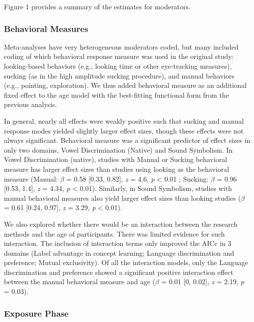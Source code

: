 \documentclass[10pt, letterpaper]{article}
\begin{document}
Figure 1 provides a summary of the estimates for moderators.

\hypertarget{behavioral-measures}{%
\subsubsection{Behavioral Measures}\label{behavioral-measures}}

Meta-analyses have very heterogeneous moderators coded, but many
included coding of which behavioral response measure was used in the
original study: looking-based behaviors (e.g., looking time or other
eye-tracking measures), sucking (as in the high amplitude sucking
procedure), and manual behaviors (e.g., pointing, exploration). We thus
added behavioral measure as an additional fixed effect to the age model
with the best-fitting functional form from the previous analysis.

In general, nearly all effects were weakly positive such that sucking
and manual response modes yielded slightly larger effect sizes, though
these effects were not always significant. Behavioral measure was a
significant predictor of effect sizes in only two domains, Vowel
Discrimination (Native) and Sound Symbolism. In Vowel Discrimination
(native), studies with Manual or Sucking behavioral measure has larger
effect sizes than studies using looking as the behavioral measure
(Manual: \(\beta\) = 0.58 {[}0.33, 0.82{]}, \emph{z} = 4.6, \emph{p}
\textless{} 0.01 ; Sucking: \(\beta\) = 0.96 {[}0.53, 1.4{]}, \emph{z} =
4.34, \emph{p} \textless{} 0.01). Similarly, in Sound Symbolism, studies
with manual behavioral measures also yield larger effect sizes than
looking studies (\(\beta\) = 0.61 {[}0.24, 0.97{]}, \emph{z} = 3.29,
\emph{p} \textless{} 0.01).

We also explored whether there would be an interaction between the
research methods and the age of participants. There was limited evidence
for such interaction. The inclusion of interaction terms only improved
the AICc in 3 domains (Label advantage in concept learning; Language
discrimination and preference; Mutual exclusivity). Of all the
interaction models, only the Language discrimination and preference
showed a significant positive interaction effect between the manual
behavioral measure and age (\(\beta\) = 0.01 {[}0, 0.02{]}, \emph{z} =
2.19, \emph{p} = 0.03).

\hypertarget{exposure-phase}{%
\subsubsection{Exposure Phase}\label{exposure-phase}}
\end{document}
